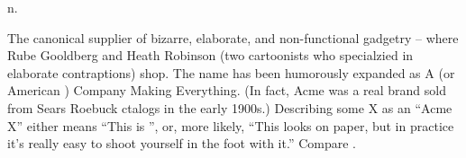  n.

The canonical supplier of bizarre, elaborate, and non-functional gadgetry -- where Rube Gooldberg and Heath Robinson (two cartoonists who
specialzied in elaborate contraptions) shop. The name has been humorously expanded as A (or American ) Company Making Everything. (In fact,
Acme was a real brand sold from Sears Roebuck ctalogs in the early 1900s.) Describing some X as an ``Acme X'' either means ``This is
'', or, more likely, ``This looks  on paper, but in practice it's really easy to shoot
yourself in the foot with it.'' Compare .


